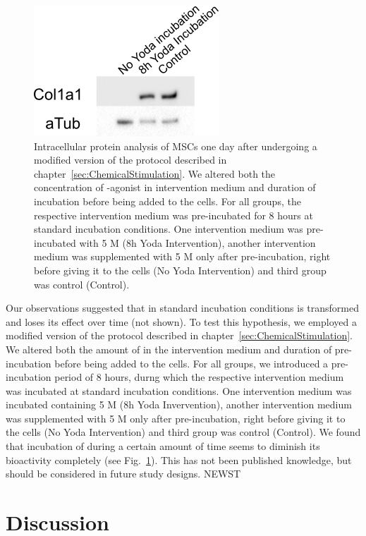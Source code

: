 \begin{figure}
	\centering
	\includegraphics[width = 0.4\linewidth{}]{Inkubationshypothese.png}
	\caption{Intracellular protein analysis of MSCs one day after undergoing a modified version of the protocol described in chapter~\ref{sec:ChemicalStimulation}. We altered both the concentration of \Piezo{}-agonist \Yoda{} in intervention medium and duration of \Yoda{} incubation before being added to the cells. For all groups, the respective intervention medium was pre-incubated for 8 hours at standard incubation conditions. One intervention medium was pre-incubated with 5 \textmu{}M \Yoda{} (8h Yoda Intervention), another intervention medium was supplemented with 5 \textmu{}M \Yoda{} only after pre-incubation, right before giving it to the cells (No Yoda Intervention) and third group was \Yoda{} control (Control).}
	\label{fig:Inkubationshypothese_Western}
\end{figure}

Our observations suggested that in standard incubation conditions \Yoda{} is transformed and loses its effect over time (not shown). To test this hypothesis, we employed a modified version of the protocol described in chapter~\ref{sec:ChemicalStimulation}. We altered both the amount of \Yoda{} in the intervention medium and duration of \Yoda{} pre-incubation before being added to the cells. For all groups, we introduced a pre-incubation period of 8 hours, durng which the respective intervention medium was incubated at standard incubation conditions. One intervention medium was incubated containing 5 \mul{}M \Yoda{} (8h Yoda Invervention), another intervention medium was supplemented with 5 \mul{}M \Yoda{} only after pre-incubation, right before giving it to the cells (No Yoda Intervention) and third group was \Yoda{} control (Control). We found that incubation of \Yoda{} during a certain amount of time seems to diminish its bioactivity completely (see Fig.~\ref{fig:Inkubationshypothese_Western}). This has not been published knowledge, but should be considered in future study designs. NEWST

\chapter{Discussion}




